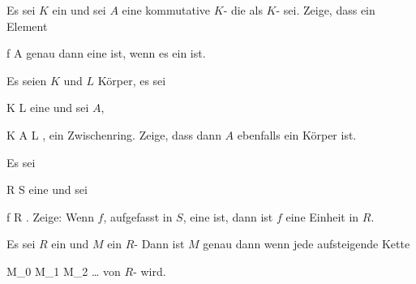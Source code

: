 \setcounter{section}{10}







{}
{





Es sei $K$ ein
und sei $A$ eine kommutative
$K$-
die als
$K$-
sei. Zeige, dass ein Element

\mavergleichskette
{\vergleichskette
{ f
}
{ \in }{ A
}
{  }{
}
{    }{
}
{   }{
}
}
{}{}{}
genau dann eine
ist, wenn es ein
ist.





}
{} {}

{}
{





Es seien $K$ und $L$ Körper, es sei

\mavergleichskette
{\vergleichskette
{ K
}
{ \subseteq }{ L
}
{  }{
}
{    }{
}
{   }{
}
}
{}{}{}
eine
und sei $A$,

\mavergleichskette
{\vergleichskette
{ K
}
{ \subseteq }{ A
}
{ \subseteq }{ L
}
{    }{
}
{   }{
}
}
{}{}{,}
ein Zwischenring. Zeige, dass dann $A$ ebenfalls ein Körper ist.





}
{} {}

{}
{





Es sei

\mavergleichskette
{\vergleichskette
{ R
}
{ \subseteq }{ S
}
{  }{
}
{    }{
}
{   }{
}
}
{}{}{}
eine
und sei

\mavergleichskette
{\vergleichskette
{ f
}
{ \in }{ R
}
{  }{
}
{    }{
}
{   }{
}
}
{}{}{.}
Zeige: Wenn $f$, aufgefasst in $S$, eine
ist, dann ist $f$ eine Einheit in $R$.





}
{} {}

{}
{





Es sei $R$ ein
 und $M$ ein
$R$- Dann ist $M$ genau dann
wenn jede aufsteigende Kette

\mavergleichskettedisp
{\vergleichskette
{ M_0
}
{ \subseteq} { M_1
}
{ \subseteq} { M_2
}
{ \subseteq} { \ldots
}
{ } {
}
}
{}{}{}
von
$R$-
wird.





}
{} {}


